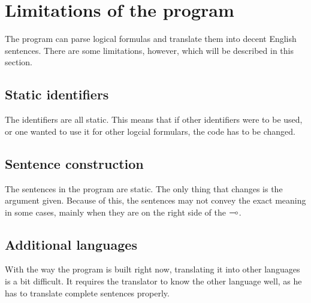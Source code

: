 \section{Limitations of the program}
\label{04_04}

The program can parse logical formulas and translate them into decent English sentences. There are some limitations, however, which will be described in this section.

\subsection{Static identifiers}
\label{04_04_01}

The identifiers are all static. This means that if other identifiers were to be used, or one wanted to use it for other logcial formulars, the code has to be changed. 

\subsection{Sentence construction}
\label{04_04_02}

The sentences in the program are static. The only thing that changes is the argument given. Because of this, the sentences may not convey the exact meaning in some cases, mainly when they are on the right side of the $\multimap$. 

\subsection{Additional languages}
\label{04_04_03}

With the way the program is built right now, translating it into other languages is a bit difficult. It requires the translator to know the other language well, as he has to translate complete sentences properly. 
